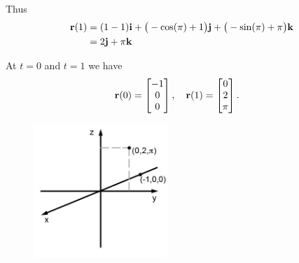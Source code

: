 Thus
\begin{align*}
  \mathbf{r}(1) &= (1-1)\mathbf{i}+ \big(-\cos(\pi)+1\big)\mathbf{j} + \big(- \sin(\pi) + \pi \big) \mathbf{k} \\
  &= 2\mathbf{j} + \pi\mathbf{k}
\end{align*}
\item At $t=0$ and $t=1$ we have 
\begin{align*}
  \mathbf{r}(0) &= \begin{bmatrix} -1 \\ 0 \\ 0 \end{bmatrix} , \quad
  \mathbf{r}(1) = \begin{bmatrix} 0 \\ 2 \\ \pi \end{bmatrix}.
\end{align*}
\EEN
\begin{figure}[h]
  \vspace{-10pt}
  \begin{center}
    \includegraphics[width=0.45\textwidth]{ImgParticle.jpg}
  \end{center}
  \vspace{-20pt}
\end{figure}
\EEN %




